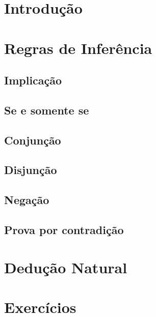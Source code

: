 \section{Introdução}

\section{Regras de Inferência}

\subsection{Implicação} 
\subsection{Se e somente se}
\subsection{Conjunção}
\subsection{Disjunção}
\subsection{Negação}
\subsection{Prova por contradição}

\section{Dedução Natural}

\section{Exercícios}
